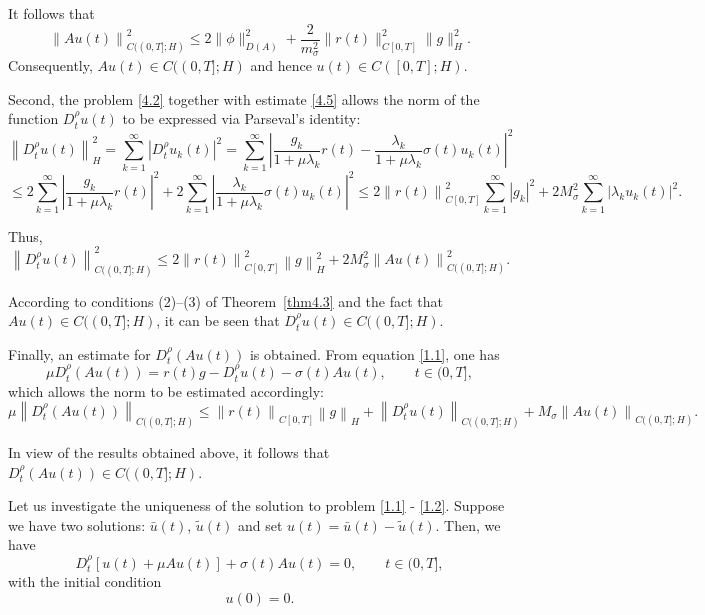 \documentclass[reqno]{amsart}
\theoremstyle{definition}
\numberwithin{equation}{section}
\begin{document}
It follows that
$$
\left\| Au(t) \right\|_{C((0,T];H)}^{2}\le  2\|\phi\|_{D(A)}^2+\frac{2}{m_\sigma^2}\|r(t)\|_{C[0, T]}^2\|g\|_H^2.
$$
Consequently, $Au(t) \in C((0,T];H)$ and hence $u(t) \in C([0,T];H)$.

Second, the problem \eqref{4.2} together with estimate \eqref{4.5} allows the norm of the function $D_{t}^{\rho }u(t)$ to be expressed via Parseval’s identity:
$$
\left\| D_{t}^{\rho }u(t) \right\|_{H}^{2}=\sum\limits_{k=1}^{\infty }{{{\left| D_{t}^{\rho }{{u}_{k}}(t) \right|}^{2}}}=\sum\limits_{k=1}^{\infty }{{{\left| \frac{{{g}_{k}}}{1+\mu {{\lambda }_{k}}}r(t)-\frac{{{\lambda }_{k}}}{1+\mu {{\lambda }_{k}}}\sigma (t){{u}_{k}}(t) \right|}^{2}}}
$$
$$
\le 2\sum\limits_{k=1}^{\infty }{{{\left| \frac{{{g}_{k}}}{1+\mu {{\lambda }_{k}}}r(t) \right|}^{2}}}+2\sum\limits_{k=1}^{\infty }{{{\left| \frac{{{\lambda }_{k}}}{1+\mu {{\lambda }_{k}}}\sigma (t){{u}_{k}}(t) \right|}^{2}}}\le 2\left\| r(t) \right\|_{C[0,T]}^{2}\sum\limits_{k=1}^{\infty }{{{\left| {{g}_{k}} \right|}^{2}}}+2M_{\sigma }^{2}\sum\limits_{k=1}^{\infty }{{{\left| {{\lambda }_{k}}{{u}_{k}}(t) \right|}^{2}}}.
$$

Thus,
$$
\left\| D_{t}^{\rho }u(t) \right\|_{C((0,T];H)}^{2}\le 2\left\| r(t) \right\|_{C[0,T]}^{2}\left\| g \right\|_{H}^{2}+2M_{\sigma }^{2}\left\| Au(t) \right\|_{C((0,T];H)}^{2}.
$$

According to conditions (2)–(3) of Theorem~\ref{thm4.3} and the fact that $Au(t) \in C((0,T];H)$, it can be seen that  $D_{t}^{\rho }u(t)\in C((0,T];H)$.

Finally, an estimate for $D_{t}^{\rho }(Au(t))$ is obtained. From equation \eqref{1.1}, one has
$$
\mu D_{t}^{\rho }(Au(t))=r(t)g-D_{t}^{\rho }u(t)-\sigma (t)Au(t), \qquad t \in (0,T],
$$
which allows the norm to be estimated accordingly:
$$
\mu {{\left\| D_{t}^{\rho }(Au(t)) \right\|}_{C((0,T];H)}}\le {{\left\| r(t) \right\|}_{C[0,T]}}{{\left\| g \right\|}_{H}}+{{\left\| D_{t}^{\rho }u(t) \right\|}_{C((0,T];H)}}+M_{\sigma}{{\left\| Au(t) \right\|}_{C((0,T];H)}}.
$$

In view of the results obtained above, it follows that $D_{t}^{\rho }(Au(t)) \in C((0,T];H)$.

Let us investigate the uniqueness of the solution to problem \eqref{1.1} - \eqref{1.2}. Suppose we have two solutions: $\bar{u}(t)$, $\tilde{u}(t)$ and set $u(t) = \bar{u}(t) - \tilde{u}(t)$. Then, we have 
\begin{equation} \label{4.6}
    D_t^{\rho} [u(t) + \mu Au(t)] + \sigma(t) Au(t) = 0, \qquad t \in (0,T],
\end{equation}
with the initial condition 
\begin{equation} \label{4.7}
    u(0) = 0.
\end{equation}
\end{document}

